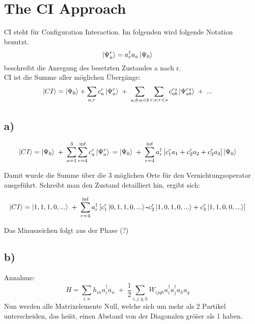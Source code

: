 \section{The CI Approach}

CI steht f\"ur Configuration Interaction. Im folgenden wird folgende Notation benutzt.
\begin{equation}
\Ket{\Psi_a^r} = a_r^{\dagger} a_a \Ket{\Psi_0}
\end{equation}
beschreibt die Anregung des besetzten Zustandes a nach r.\\
CI ist die Summe aller m\"oglichen \"Uberg\"ange:
\begin{equation}
\Ket{CI} = \Ket{\Psi_0} + \sum_{a,r} c_a^r \Ket{\Psi_a^r} \; + \; \sum_{a,b:a<b} \sum_{r,s:r<s} c_{ab}^{rs} \Ket{\Psi_{ab}^{rs}} \; + \; ...
\end{equation}

\subsection{a)}
\begin{equation}
\Ket{CI} = \Ket{\Psi_0} \; + \; \sum_{a=1}^3 \sum_{r=4}^{\inf} c_a^r \Ket{\Psi_a^r} \\
= \Ket{\Psi_0} \; + \; \sum_{r=4}^{\inf} a_r^{\dagger} \left[ c_1^r a_1 + c_2^r a_2 + c_3^r a_3 \right] \Ket{\Psi_0}
\end{equation}

Damit wurde die Summe \"uber die 3 m\"oglichen Orte f\"ur den Vernichtungsoperator ausgef\"uhrt. Schreibt man den Zustand detailliert hin, ergibt sich:

\begin{equation}
\Ket{CI} = \Ket{1,1,1,0,...} \; + \; \sum_{r=4}^{\inf} a_r^{\dagger} \left[ c_1^r \Ket{0,1,1,0,...} \textbf{-} c_2^r \Ket{1,0,1,0,...} + c_3^r \Ket{1,1,0,0,...} \right]
\end{equation}

Das Minuszeichen folgt aus der Phase (?)

\subsection{b)}
Annahme:
\begin{equation}
H = \sum_{i,n} h_{in} a_i^{\dagger}a_n \; + \; \frac{1}{2} \sum_{i,j,q,h} W_{ijqh} a_i^{\dagger} a_j^{\dagger} a_h a_q
\end{equation}
Nun werden alle Matrixelemente Null, welche sich um mehr als 2 Partikel unterscheiden, das hei\"st, einen Abstand von der Diagonalen gr\"o\"ser als 1 haben.

